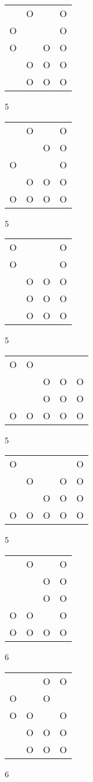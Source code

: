 \begin{tabular}{|m{0.2cm}m{0.2cm}m{0.2cm}m{0.2cm}|}\hline
 &O& &O\\
O& & &O\\
O& &O&O\\
 &O&O&O\\
 &O&O&O\\
\hline\end{tabular}5
\begin{tabular}{|m{0.2cm}m{0.2cm}m{0.2cm}m{0.2cm}|}\hline
 &O& &O\\
 & &O&O\\
O& & &O\\
 &O&O&O\\
O&O&O&O\\
\hline\end{tabular}5
\begin{tabular}{|m{0.2cm}m{0.2cm}m{0.2cm}m{0.2cm}|}\hline
O& & &O\\
O& & &O\\
 &O&O&O\\
 &O&O&O\\
 &O&O&O\\
\hline\end{tabular}5
\begin{tabular}{|m{0.2cm}m{0.2cm}m{0.2cm}m{0.2cm}m{0.2cm}|}\hline
O&O& & & \\
 & &O&O&O\\
 & &O&O&O\\
O&O&O&O&O\\
\hline\end{tabular}5
\begin{tabular}{|m{0.2cm}m{0.2cm}m{0.2cm}m{0.2cm}m{0.2cm}|}\hline
O& & & &O\\
 &O& &O&O\\
 & &O&O&O\\
O&O&O&O&O\\
\hline\end{tabular}5
\begin{tabular}{|m{0.2cm}m{0.2cm}m{0.2cm}m{0.2cm}|}\hline
 &O& &O\\
 & &O&O\\
 & &O&O\\
O&O& &O\\
O&O&O&O\\
\hline\end{tabular}6
\begin{tabular}{|m{0.2cm}m{0.2cm}m{0.2cm}m{0.2cm}|}\hline
 & &O&O\\
O& &O& \\
O&O& &O\\
 &O&O&O\\
 &O&O&O\\
\hline\end{tabular}6
